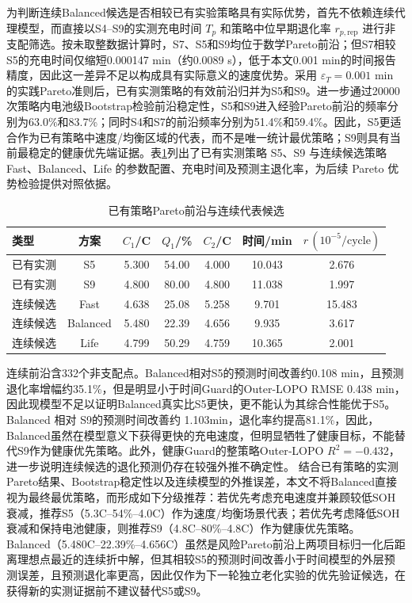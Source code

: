 \documentclass[withoutpreface]{cumcmthesis}
\begin{document}
为判断连续Balanced候选是否相较已有实验策略具有实际优势，首先不依赖连续代理模型，而直接以S4--S9的实测充电时间 $T_p$ 和策略中位早期退化率 $r_{p,\text{rep}}$ 进行非支配筛选。按未取整数据计算时，S7、S5和S9均位于数学Pareto前沿；但S7相较S5的充电时间仅缩短0.000147 min（约0.0089 s），低于本文0.001 min的时间报告精度，因此这一差异不足以构成具有实际意义的速度优势。采用 $\varepsilon_T=0.001$ min 的实践Pareto准则后，已有实测策略的有效前沿归并为S5和S9。进一步通过20000次策略内电池级Bootstrap检验前沿稳定性，S5和S9进入经验Pareto前沿的频率分别为63.0\%和83.7\%；同时S4和S7的前沿频率分别为51.4\%和59.4\%。因此，S5更适合作为已有策略中速度/均衡区域的代表，而不是唯一统计最优策略；S9则具有当前最稳定的健康优先端证据。表\ref{tab:p4-recommendations}列出了已有实测策略 S5、S9 与连续候选策略 Fast、Balanced、Life 的参数配置、充电时间及预测主退化率，为后续 Pareto 优势检验提供对照依据。
\begin{table}[H]
\centering
\caption{已有策略Pareto前沿与连续代表候选}
\label{tab:p4-recommendations}
\small
\begin{tabular}{lcccccc}
\toprule
类型 & 方案 & $C_1$/C & $Q_1$/\% & $C_2$/C & 时间/min & $r\,(10^{-5}/\mathrm{cycle})$\\
\midrule
已有实测 & S5 & 5.300 & 54.00 & 4.000 & 10.043 & 2.676\\
已有实测 & S9 & 4.800 & 80.00 & 4.800 & 11.038 & 1.997\\
连续候选 & Fast & 4.638 & 25.08 & 5.258 & 9.701 & 15.483\\
连续候选 & Balanced & 5.480 & 22.39 & 4.656 & 9.935 & 3.617\\
连续候选 & Life & 4.799 & 50.29 & 4.759 & 10.365 & 2.001\\
\bottomrule
\end{tabular}
\end{table}

连续前沿含332个非支配点。Balanced相对S5的预测时间改善约0.108 min，且预测退化率增幅约35.1\%，但是明显小于时间Guard的Outer-LOPO RMSE 0.438 min，因此现模型不足以证明Balanced真实比S5更快，更不能认为其综合性能优于S5。Balanced 相对 S9的预测时间改善约 1.103min，退化率约提高81.1\%，因此，Balanced虽然在模型意义下获得更快的充电速度，但明显牺牲了健康目标，不能替代S9作为健康优先策略。此外，健康Guard的整策略Outer‑LOPO $R^2=-0.432$，进一步说明连续候选的退化预测仍存在较强外推不确定性。
结合已有策略的实测Pareto结果、Bootstrap稳定性以及连续模型的外推误差，本文不将Balanced直接视为最终最优策略，而形成如下分级推荐：若优先考虑充电速度并兼顾较低SOH衰减，推荐S5（5.3C–54\%–4.0C）作为速度/均衡场景代表；若优先考虑降低SOH衰减和保持电池健康，则推荐S9（4.8C–80\%–4.8C）作为健康优先策略。 Balanced（5.480C–22.39\%–4.656C）虽然是风险Pareto前沿上两项目标归一化后距离理想点最近的连续折中解，但其相较S5的预测时间改善小于时间模型的外层预测误差，且预测退化率更高，因此仅作为下一轮独立老化实验的优先验证候选，在获得新的实测证据前不建议替代S5或S9。
\end{document}
